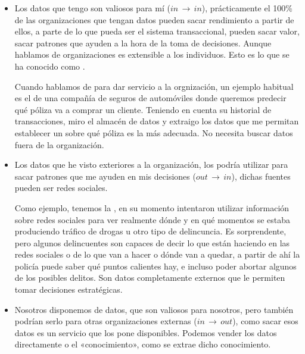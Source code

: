 \begin{itemize}
    \item Los datos que tengo son valiosos para mí ($in\,\rightarrow\,in$), prácticamente el 100\% de las organizaciones que tengan datos pueden sacar rendimiento a partir de ellos, a parte de lo que pueda ser el sistema transaccional, pueden sacar valor, sacar patrones que ayuden a la hora de la toma de decisiones. Aunque hablamos de organizaciones es extensible a los individuos. Esto es lo que se ha conocido como .
    
    Cuando hablamos de  para dar servicio a la orgnización, un ejemplo habitual es el de una compañía de seguros de automóviles donde queremos predecir qué póliza va a comprar un cliente. Teniendo en cuenta su historial de transacciones, miro el almacén de datos y extraigo los datos que me permitan establecer un  sobre qué póliza es la más adecuada. No necesita buscar datos fuera de la organización.

    \item Los datos que he visto exteriores a la organización, los podría utilizar para sacar patrones que me ayuden en mis decisiones ($out\,\rightarrow\,in$), dichas fuentes pueden ser redes sociales.
    
    Como ejemplo, tenemos la , en su momento intentaron utilizar información sobre redes sociales para ver realmente dónde y en qué momentos se estaba produciendo tráfico de drogas u otro tipo de delincuncia. Es sorprendente, pero algunos delincuentes son capaces de decir lo que están haciendo en las redes sociales o de lo que van a hacer o dónde van a quedar, a partir de ahí la policía puede saber qué puntos calientes hay, e incluso poder abortar algunos de los posibles delitos. Son datos completamente externos que le permiten tomar decisiones estratégicas.

    \item Nosotros disponemos de datos, que son valiosos para nosotros, pero también podrían serlo para otras organizaciones externas ($in\,\rightarrow\,out$), como sacar esos datos es un servicio que los pone disponibles. Podemos vender los datos directamente o el «conocimiento», como se extrae dicho conocimiento.
    

\end{itemize}
